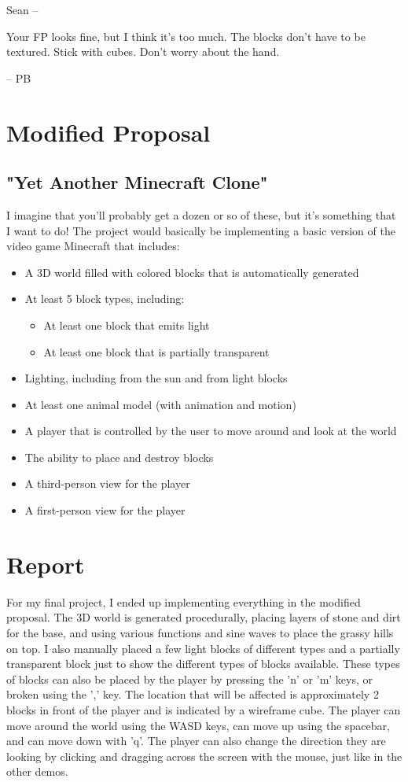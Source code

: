 \documentclass[12pt]{article}
\begin{document}
Sean --

Your FP looks fine, but I think it's too much.  The blocks don't have to be textured.  Stick with cubes.  Don't worry about the hand.

-- PB

\section{Modified Proposal}

\subsection{"Yet Another Minecraft Clone"}

I imagine that you'll probably get a dozen or so of these, but it's something that I want to do! 
The project would basically be implementing a basic version of the video game Minecraft that includes:
\begin{itemize}
    \item A 3D world filled with colored blocks that is automatically generated
    \item At least 5 block types, including:
    \begin{itemize}
        \item At least one block that emits light
        \item At least one block that is partially transparent
    \end{itemize}
    \item Lighting, including from the sun and from light blocks
    \item At least one animal model (with animation and motion)
    \item A player that is controlled by the user to move around and look at the world
    \item The ability to place and destroy blocks
    \item A third-person view for the player
    \item A first-person view for the player
\end{itemize}

\section{Report}

For my final project, I ended up implementing everything in the modified
proposal.  The 3D world is generated procedurally, placing layers of stone and
dirt for the base, and using various functions and sine waves to place the
grassy hills on top.  I also manually placed a few light blocks of different
types and a partially transparent block just to show the different types of
blocks available.  These types of blocks can also be placed by the player by
pressing the 'n' or 'm' keys, or broken using the ',' key.  The location that
will be affected is approximately 2 blocks in front of the player and is
indicated by a wireframe cube.  The player can move around the world using the
WASD keys, can move up using the spacebar, and can move down with 'q'.  The
player can also change the direction they are looking by clicking and dragging
across the screen with the mouse, just like in the other demos.
\end{document}
